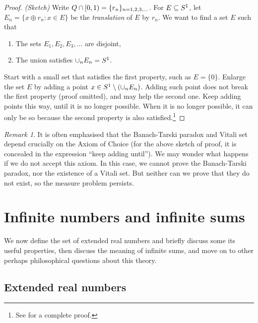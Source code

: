 \documentclass[
]{book}
\let\mathbb\relax %
\newcommand{\Q}{\mathbb{Q}}
\newcommand{\SSS}{\mathbb{S}}
\theoremstyle{definition}
\theoremstyle{definition}
\theoremstyle{definition}
\theoremstyle{definition}
\theoremstyle{remark}
\newtheorem*{remark}{Remark}
\begin{document}
\begin{proof}
\emph{(Sketch)} Write \(\Q \cap [0,1) = \{r_n\}_{n=1,2,3,\dots}\). For
\(E \subseteq \SSS^1\), let \(E_n = \{ x \oplus r_n : x \in E \}\) be the
\emph{translation} of \(E\) by \(r_n\). We want to find a set \(E\) such that

\begin{enumerate}
\def\labelenumi{\arabic{enumi}.}
\item
  The sets \(E_1,E_2,E_3,\dots\) are disjoint,
\item
  The union satisfies \(\cup_n E_n = \SSS^1\).
\end{enumerate}

Start with a small set that satisfies the first property, such as
\(E = \{0\}\). Enlarge the set \(E\) by adding a point
\(x \in \SSS^1 \setminus (\cup_n E_n)\). Adding such point does not break
the first property (proof omitted), and may help the second one. Keep
adding points this way, until it is no longer possible. When it is no
longer possible, it can only be so because the second property is also
satisfied.\footnote{See \citep[ 1.4.9]{Cohn13} for a complete proof.}
\end{proof}

\begin{remark}
It is often emphasised that the Banach-Tarski paradox and Vitali set
depend crucially on the Axiom of Choice (for the above sketch of proof,
it is concealed in the expression ``keep adding until''). We may wonder
what happens if we do not accept this axiom. In this case, we cannot
prove the Banach-Tarski paradox, nor the existence of a Vitali set. But
neither can we prove that they do not exist, so the measure problem
persists.
\end{remark}

\hypertarget{sub:infinitenumbers}{%
\section{Infinite numbers and infinite sums}\label{sub:infinitenumbers}}

We now define the set of extended real numbers and briefly discuss some
its useful properties, then discuss the meaning of infinite sums, and
move on to other perhaps philosophical questions about this theory.

\hypertarget{subsub:extended}{%
\subsection{Extended real numbers}\label{subsub:extended}}
\end{document}
